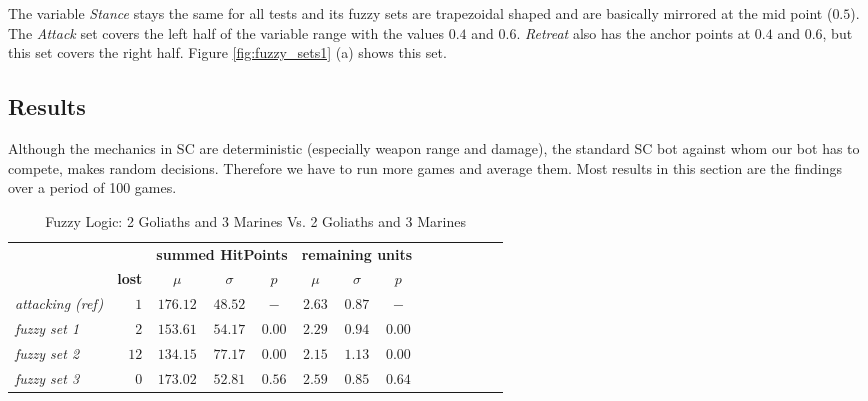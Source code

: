 The variable {\it Stance} stays the same for all tests and its fuzzy sets are trapezoidal shaped and are basically mirrored at the mid point ($0.5$). The {\it Attack} set covers the left half of the variable range with the values $0.4$ and $0.6$. {\it Retreat} also has the anchor points at $0.4$ and $0.6$, but this set covers the right half. Figure \ref{fig:fuzzy_sets1} (a) shows this set.


%
\subsection{Results}
\label{subsection:fuzzy:results}
%
Although the mechanics in SC are deterministic (especially weapon range and damage), the standard SC bot against whom our bot has to compete, makes random decisions. Therefore we have to run more games and average them. Most results in this section are the findings over a period of 100 games.
%
\begin{table*}[htbp]
\caption{Fuzzy Logic: 2 Goliaths and 3 Marines Vs. 2 Goliaths and 3 Marines}
\begin{center}
\begin{tabular}{|l|r|c|c|c|c|c|c|c|ccccc}
\hline
	&  & \multicolumn{3}{|c|}{\bf summed HitPoints} 	& \multicolumn{3}{|c|}{\bf remaining units}  \\
	& \multicolumn{1}{|c|}{\bf lost} & $\mu$ & $\sigma$ & $p$ & 		$\mu$ & $\sigma$ & $p$ \\
\hline
{\it attacking (ref)}			&$ 1   $&$ 	176.12 $&$  48.52$&$ - $&$			2.63 $&$   0.87 $&$ - $ \\ %
\emph{ fuzzy set 1} 		&$ 2   $&$ 	153.61$&$   54.17$&$ 0.00 $&$ 			2.29 $&$   0.94 $&$ 0.00 $\\ %
\emph{ fuzzy set 2}		&$ 12 $&$ 	134.15 $&$  77.17$&$ 0.00 $&$     		2.15 $&$   1.13 $&$ 0.00 $ \\ %
\emph{ fuzzy set 3}		&$ 0 $&$ 	173.02 $&$  52.81$&$ 0.56 $&$     		2.59 $&$   0.85 $&$ 0.64 $ \\ %
\hline
\end{tabular}  
\label{table:fuzzy_tTestSmallSquad}
\end{center}
\end{table*}
